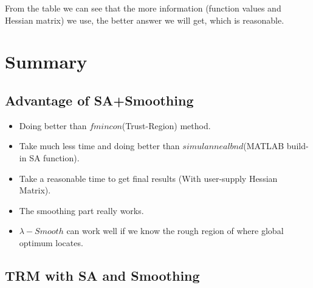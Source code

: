 \documentclass[letterpaper,12pt,titlepage,oneside,final]{book}
\begin{document}
From the table we can see that the more information (function values and Hessian matrix) we use, the better answer we will get, which is reasonable.

\chapter{Summary}

\section{Advantage of SA+Smoothing}

\begin{itemize}

\item Doing better than $fmincon$(Trust-Region) method.

\item Take much less time and doing better than $simulannealbnd$(MATLAB build-in SA function).

\item Take a reasonable time to get final results (With user-supply Hessian Matrix).

\item The smoothing part really works.

\item $\lambda-Smooth$ can work well if we know the rough region of where global optimum locates.

\end{itemize}

\section{TRM with SA and Smoothing}
\end{document}
